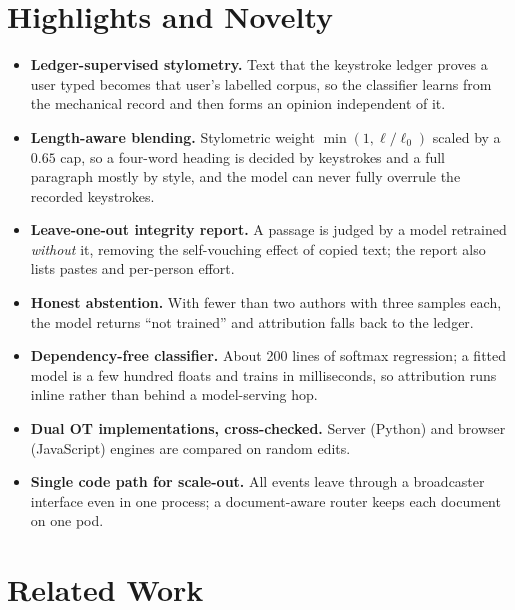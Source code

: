 \documentclass[conference]{IEEEtran}
\begin{document}
\section{Highlights and Novelty}
\begin{itemize}
\item \textbf{Ledger-supervised stylometry.} Text that the keystroke ledger proves a user typed becomes that user's labelled corpus, so the classifier learns from the mechanical record and then forms an opinion independent of it.
\item \textbf{Length-aware blending.} Stylometric weight $\min(1,\ell/\ell_{0})$ scaled by a $0.65$ cap, so a four-word heading is decided by keystrokes and a full paragraph mostly by style, and the model can never fully overrule the recorded keystrokes.
\item \textbf{Leave-one-out integrity report.} A passage is judged by a model retrained \emph{without} it, removing the self-vouching effect of copied text; the report also lists pastes and per-person effort.
\item \textbf{Honest abstention.} With fewer than two authors with three samples each, the model returns ``not trained'' and attribution falls back to the ledger.
\item \textbf{Dependency-free classifier.} About 200 lines of softmax regression; a fitted model is a few hundred floats and trains in milliseconds, so attribution runs inline rather than behind a model-serving hop.
\item \textbf{Dual OT implementations, cross-checked.} Server (Python) and browser (JavaScript) engines are compared on random edits.
\item \textbf{Single code path for scale-out.} All events leave through a broadcaster interface even in one process; a document-aware router keeps each document on one pod.
\end{itemize}

\section{Related Work}
\end{document}
